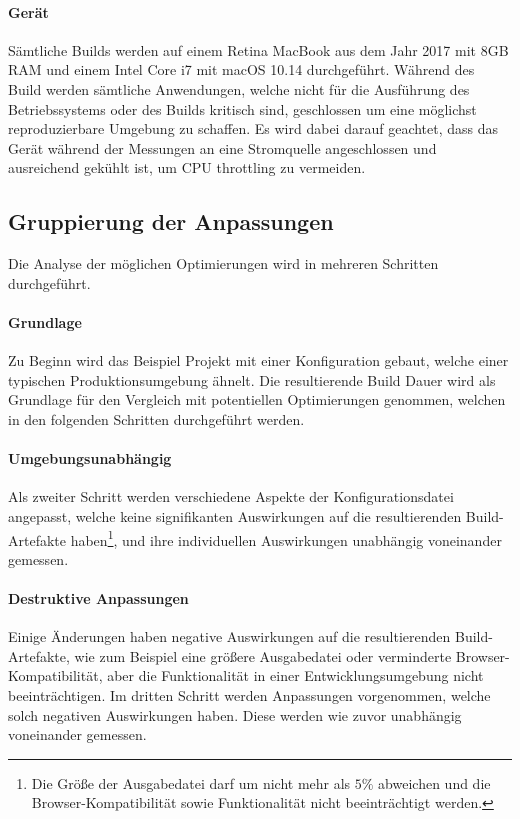 \documentclass[11pt]{report}
\begin{document}
				\paragraph{Gerät} Sämtliche Builds werden auf einem Retina MacBook aus dem Jahr 2017 mit 8GB RAM und einem Intel Core i7 mit macOS 10.14 durchgeführt. Während des Build werden sämtliche Anwendungen, welche nicht für die Ausführung des Betriebssystems oder des Builds kritisch sind, geschlossen um eine möglichst reproduzierbare Umgebung zu schaffen. Es wird dabei darauf geachtet, dass das Gerät während der Messungen an eine Stromquelle angeschlossen und ausreichend gekühlt ist, um CPU throttling zu vermeiden.

			\subsection{Gruppierung der Anpassungen}
				Die Analyse der möglichen Optimierungen wird in mehreren Schritten durchgeführt.
				\paragraph{Grundlage}\label{baseline-build} Zu Beginn wird das Beispiel Projekt mit einer Konfiguration gebaut, welche einer typischen Produktionsumgebung ähnelt. Die resultierende Build Dauer wird als Grundlage für den Vergleich mit potentiellen Optimierungen genommen, welchen in den folgenden Schritten durchgeführt werden.

				\paragraph{Umgebungsunabhängig} Als zweiter Schritt werden verschiedene Aspekte der Konfigurationsdatei angepasst, welche keine signifikanten Auswirkungen auf die resultierenden Build-Artefakte haben\footnote{Die Größe der Ausgabedatei darf um nicht mehr als $5\%$ abweichen und die Browser-Kompatibilität sowie Funktionalität nicht beeinträchtigt werden.}, und ihre individuellen Auswirkungen unabhängig voneinander gemessen.

				\paragraph{Destruktive Anpassungen} Einige Änderungen haben negative Auswirkungen auf die resultierenden Build-Artefakte, wie zum Beispiel eine größere Ausgabedatei oder verminderte Browser-Kompatibilität, aber die Funktionalität in einer Entwicklungsumgebung nicht beeinträchtigen. Im dritten Schritt werden Anpassungen vorgenommen, welche solch negativen Auswirkungen haben. Diese werden wie zuvor unabhängig voneinander gemessen.
\end{document}
